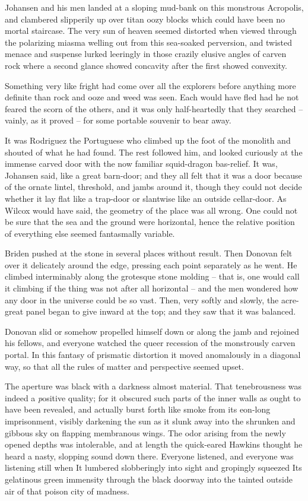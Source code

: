Johansen and his men landed at a sloping mud-bank on this monstrous Acropolis, and clambered slipperily up over titan oozy blocks which could have been no mortal staircase. The very sun of heaven seemed distorted when viewed through the polarizing miasma welling out from this sea-soaked perversion, and twisted menace and suspense lurked leeringly in those crazily elusive angles of carven rock where a second glance showed concavity after the first showed convexity.

Something very like fright had come over all the explorers before anything more definite than rock and ooze and weed was seen. Each would have fled had he not feared the scorn of the others, and it was only half-heartedly that they searched⁠ – vainly, as it proved⁠ – for some portable souvenir to bear away.

It was Rodriguez the Portuguese who climbed up the foot of the monolith and shouted of what he had found. The rest followed him, and looked curiously at the immense carved door with the now familiar squid-dragon bas-relief. It was, Johansen said, like a great barn-door; and they all felt that it was a door because of the ornate lintel, threshold, and jambs around it, though they could not decide whether it lay flat like a trap-door or slantwise like an outside cellar-door. As Wilcox would have said, the geometry of the place was all wrong. One could not be sure that the sea and the ground were horizontal, hence the relative position of everything else seemed fantasmally variable.

Briden pushed at the stone in several places without result. Then Donovan felt over it delicately around the edge, pressing each point separately as he went. He climbed interminably along the grotesque stone molding⁠ – that is, one would call it climbing if the thing was not after all horizontal⁠ – and the men wondered how any door in the universe could be so vast. Then, very softly and slowly, the acre-great panel began to give inward at the top; and they saw that it was balanced.

Donovan slid or somehow propelled himself down or along the jamb and rejoined his fellows, and everyone watched the queer recession of the monstrously carven portal. In this fantasy of prismatic distortion it moved anomalously in a diagonal way, so that all the rules of matter and perspective seemed upset.

The aperture was black with a darkness almost material. That tenebrousness was indeed a {\emph positive quality}; for it obscured such parts of the inner walls as ought to have been revealed, and actually burst forth like smoke from its eon-long imprisonment, visibly darkening the sun as it slunk away into the shrunken and gibbous sky on flapping membranous wings. The odor arising from the newly opened depths was intolerable, and at length the quick-eared Hawkins thought he heard a nasty, slopping sound down there. Everyone listened, and everyone was listening still when It lumbered slobberingly into sight and gropingly squeezed Its gelatinous green immensity through the black doorway into the tainted outside air of that poison city of madness.

